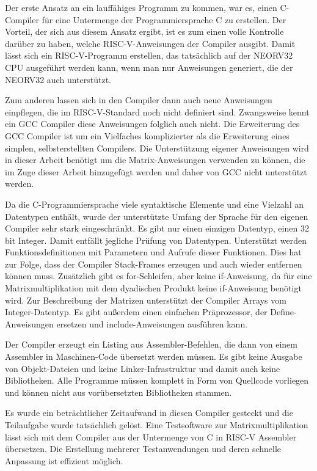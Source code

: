 Der erste Ansatz an ein lauffähiges Programm zu kommen, war es, einen C-Compiler für eine Untermenge der Programmiersprache C zu erstellen. Der Vorteil, der sich aus diesem Ansatz ergibt, ist es zum einen volle Kontrolle darüber zu haben, welche RISC-V-Anweisungen der Compiler ausgibt. Damit lässt sich ein RISC-V-Programm erstellen, das tatsächlich auf der NEORV32 CPU ausgeführt werden kann, wenn man nur Anweisungen generiert, die der NEORV32 auch unterstützt.

Zum anderen lassen sich in den Compiler dann auch neue Anweisungen einpflegen, die im RISC-V-Standard noch nicht definiert sind. Zwangsweise kennt ein GCC Compiler diese Anweisungen folglich auch nicht. Die Erweiterung des GCC Compiler ist um ein Vielfaches komplizierter als die Erweiterung eines simplen, selbsterstellten Compilers. Die Unterstützung eigener Anweisungen wird in dieser Arbeit benötigt um die Matrix-Anweisungen verwenden zu können, die im Zuge dieser Arbeit hinzugefügt werden und daher von GCC nicht unterstützt werden.

Da die C-Programmiersprache viele syntaktische Elemente und eine Vielzahl an Datentypen enthält, wurde der unterstützte Umfang der Sprache für den eigenen Compiler sehr stark eingeschränkt. Es gibt nur einen einzigen Datentyp, einen 32 bit Integer. Damit entfällt jegliche Prüfung von Datentypen. Unterstützt werden Funktionsdefinitionen mit Parametern und Aufrufe dieser Funktionen. Dies hat zur Folge, dass der Compiler Stack-Frames erzeugen und auch wieder entfernen können muss. Zusätzlich gibt es for-Schleifen, aber keine if-Anweisung, da für eine Matrixmultiplikation mit dem dyadischen Produkt keine if-Anweisung benötigt wird. Zur Beschreibung der Matrizen unterstützt der Compiler Arrays vom Integer-Datentyp. Es gibt außerdem einen einfachen Präprozessor, der Define-Anweisungen ersetzen und include-Anweisungen ausführen kann.

Der Compiler erzeugt ein Listing aus Assembler-Befehlen, die dann von einem Assembler in Maschinen-Code übersetzt werden müssen. Es gibt keine Ausgabe von Objekt-Dateien und keine Linker-Infrastruktur und damit auch keine Bibliotheken. Alle Programme müssen komplett in Form von Quellcode vorliegen und können nicht aus vorübersetzten Bibliotheken stammen.

Es wurde ein beträchtlicher Zeitaufwand in diesen Compiler gesteckt und die Teilaufgabe wurde tatsächlich gelöst. Eine Testsoftware zur Matrixmultiplikation lässt sich mit dem Compiler aus der Untermenge von C in RISC-V Assembler übersetzen. Die Erstellung mehrerer Testanwendungen und deren schnelle Anpassung ist effizient möglich.

